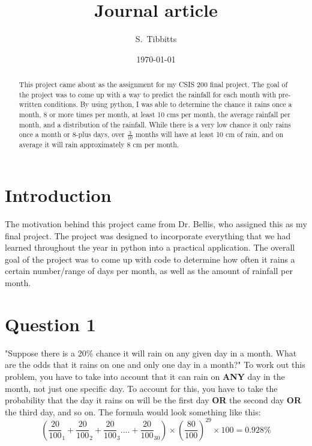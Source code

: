 \documentclass[twocolumn]{revtex4}
\begin{document}
\title{
Journal article
}

\author{S.~Tibbitts}

\date{\today}

\begin{abstract}
    This project came about as the assignment for my CSIS 200 final project.  The goal of the project was to come up with a way to predict the rainfall for each month with pre-written conditions.  By using python, I was able to determine the chance it rains once a month, 8 or more times per month, at least 10 cms per month, the average rainfall per month, and a distribution of the rainfall.  While there is a very low chance it only rains once a month or 8-plus days, over $\frac{3}{10}$ months will have at least 10 cm of rain, and on average it will rain approximately 8 cm per month.
\end{abstract}

\maketitle

\section{Introduction}

The motivation behind this project came from Dr. Bellis, who assigned this as my final project.  The project was designed to incorporate everything that we had learned throughout the year in python into a practical application.  The overall goal of the project was to come up with code to determine how often it rains a certain number/range of days per month, as well as the amount of rainfall per month.


\section{Question 1}
"Suppose there is a 20\% chance it will rain on any given day in a month.  What are the odds that it rains on one and only one day in a month?"
To work out this problem, you have to take into account that it can rain on \textbf{ANY} day in the month, not just one specific day.  To account for this, you have to take the probability that the day it rains on will be the first day \textbf{OR} the second day \textbf{OR} the third day, and so on.  The formula would look something like this: 
$$ ( \frac{20}{100}_1 + \frac{20}{100}_2 + \frac{20}{100}_3 .... + \frac {20}{100} _ {30} ) \times (\frac{80}{100})^{29} \times 100 = 0.928 \%$$
\end{document}
